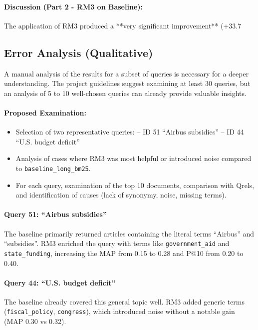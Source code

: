 \documentclass[11pt,a4paper]{article}
\begin{document}
\paragraph{Discussion (Part 2 - RM3 on Baseline):}
The application of RM3 produced a **very significant improvement** (+33.7%

\subsection{Error Analysis (Qualitative)}
A manual analysis of the results for a subset of queries is necessary for a deeper understanding. The project guidelines suggest examining at least 30 queries, but an analysis of 5 to 10 well-chosen queries can already provide valuable insights.

\paragraph{Proposed Examination:}
\begin{itemize}
  \item Selection of two representative queries:  
    – ID 51 “Airbus subsidies”  
    – ID 44 “U.S. budget deficit”  
  \item Analysis of cases where RM3 was most helpful or introduced noise  
    compared to \texttt{baseline\_long\_bm25}.  
  \item For each query, examination of the top 10 documents,  
    comparison with Qrels, and identification of causes (lack of synonymy,  
    noise, missing terms).
\end{itemize}

\paragraph{Query 51: “Airbus subsidies”}  
The baseline primarily returned articles containing the literal terms “Airbus” and “subsidies”.  
RM3 enriched the query with terms like \texttt{government\_aid} and \texttt{state\_funding},  
increasing the MAP from 0.15 to 0.28 and P@10 from 0.20 to 0.40.

\paragraph{Query 44: “U.S. budget deficit”}  
The baseline already covered this general topic well.  
RM3 added generic terms (\texttt{fiscal\_policy}, \texttt{congress}),  
which introduced noise without a notable gain (MAP 0.30 vs 0.32).
\end{document}
